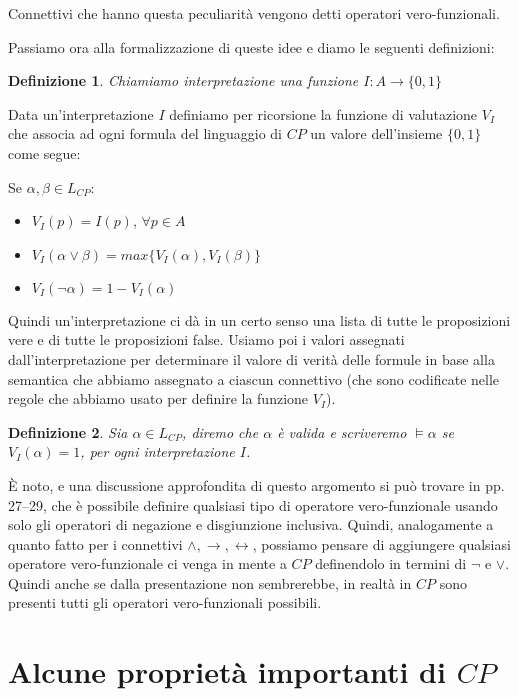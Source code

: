 \documentclass[a4paper, titlepage, 12pt]{report}
\newtheorem{definition}{Definizione}[chapter]
\begin{document}
Connettivi che hanno questa peculiarità vengono detti operatori vero-funzionali.

Passiamo ora alla formalizzazione di queste idee e diamo le seguenti definizioni:

\begin{definition}
Chiamiamo interpretazione una funzione $I: A \to \{0, 1\}$
\end{definition}

Data un'interpretazione $I$ definiamo per ricorsione la funzione di valutazione $V_I$ che associa ad ogni formula
del linguaggio di $CP$ un valore dell'insieme $\{0, 1\}$ come segue:

Se $\alpha, \beta \in L_{CP}$:
\begin{itemize}
\item $V_I(p) = I(p)$, $\forall p \in A$
\item $V_I(\alpha \lor \beta) = max\{V_I(\alpha), V_I(\beta)\}$
\item $V_I(\neg \alpha) = 1 - V_I(\alpha)$
\end{itemize}


Quindi un'interpretazione ci dà in un certo senso una lista di tutte le proposizioni
vere e di tutte le proposizioni false.
Usiamo poi i valori assegnati dall'interpretazione per determinare il valore di verità delle formule
in base alla semantica che abbiamo assegnato a ciascun connettivo (che sono codificate nelle regole
che abbiamo usato per definire la funzione $V_I$).

\begin{definition}
Sia $\alpha \in L_{CP}$, diremo che $\alpha$ è valida e scriveremo $\vDash \alpha$ se
$V_I(\alpha) = 1$, per ogni interpretazione $I$.
\end{definition}

È noto, e una discussione approfondita di questo argomento si può trovare in \cite{Mendelson}
pp. 27--29,
che è possibile definire qualsiasi tipo di operatore vero-funzionale usando
solo gli operatori di negazione e disgiunzione inclusiva.
Quindi, analogamente a quanto fatto per i connettivi $\land, \rightarrow, \leftrightarrow$,
possiamo pensare di aggiungere qualsiasi operatore vero-funzionale ci venga in mente
a $CP$ definendolo in termini di $\neg$ e $\lor$.
Quindi anche se dalla presentazione non sembrerebbe, in realtà in $CP$ sono presenti
tutti gli operatori vero-funzionali possibili.

\section{Alcune proprietà importanti di $CP$}
\end{document}
